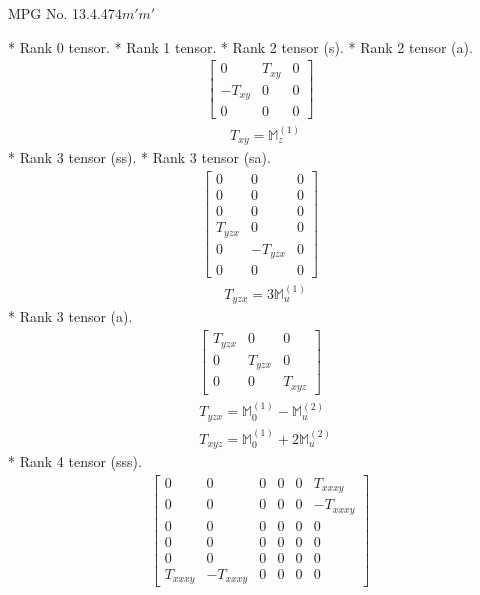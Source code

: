 \documentclass[fleqn,8pt,landscape]{jsarticle}
\begin{document}
\setcounter{MaxMatrixCols}{32}

\renewcommand{\tablename}{Table~}
\renewcommand{\figurename}{Figure~}
\begin{center}
\LARGE
MPG No. 13.4.47\quad$4m'm'$
\end{center}
* Rank 0 tensor.
* Rank 1 tensor.
* Rank 2 tensor (s).
* Rank 2 tensor (a).
\begin{align*}
\begin{bmatrix} 0 & T_{xy} & 0 \\ - T_{xy} & 0 & 0 \\ 0 & 0 & 0 \end{bmatrix}
\end{align*}
\begin{align*}
& T_{xy} = \mathbb{M}_{z}^{(1)}
\end{align*}
* Rank 3 tensor (ss).
* Rank 3 tensor (sa).
\begin{align*}
\begin{bmatrix} 0 & 0 & 0 \\ 0 & 0 & 0 \\ 0 & 0 & 0 \\ T_{yzx} & 0 & 0 \\ 0 & - T_{yzx} & 0 \\ 0 & 0 & 0 \end{bmatrix}
\end{align*}
\begin{align*}
& T_{yzx} = 3 \mathbb{M}_{u}^{(1)}
\end{align*}
* Rank 3 tensor (a).
\begin{align*}
\begin{bmatrix} T_{yzx} & 0 & 0 \\ 0 & T_{yzx} & 0 \\ 0 & 0 & T_{xyz} \end{bmatrix}
\end{align*}
\begin{align*}
& T_{yzx} = \mathbb{M}_{0}^{(1)} - \mathbb{M}_{u}^{(2)} \\
& T_{xyz} = \mathbb{M}_{0}^{(1)} + 2 \mathbb{M}_{u}^{(2)}
\end{align*}
* Rank 4 tensor (sss).
\begin{align*}
\begin{bmatrix} 0 & 0 & 0 & 0 & 0 & T_{xxxy} \\ 0 & 0 & 0 & 0 & 0 & - T_{xxxy} \\ 0 & 0 & 0 & 0 & 0 & 0 \\ 0 & 0 & 0 & 0 & 0 & 0 \\ 0 & 0 & 0 & 0 & 0 & 0 \\ T_{xxxy} & - T_{xxxy} & 0 & 0 & 0 & 0 \end{bmatrix}
\end{align*}
\end{document}
